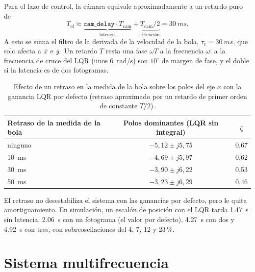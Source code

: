Para el lazo de control, la cámara equivale aproximadamente a un retardo puro de
\begin{equation}
  T_{\text{ef}} \approx \underbrace{\texttt{cam\_delay}\cdot T_{\text{cam}}}_{\text{latencia}} + \underbrace{T_{\text{cam}}/2}_{\text{retención}} = \SI{30}{ms}.
\end{equation}
A esto se suma el filtro de la derivada de la velocidad de la bola, $\tau_c=\SI{30}{ms}$, que solo afecta a $\dot{x}$ e $\dot{y}$. Un retardo $T$ resta una fase $\omega T$ a la frecuencia $\omega$: a la frecuencia de cruce del LQR (unos \SI{6}{rad/s}) son $10^\circ$ de margen de fase, y el doble si la latencia es de dos fotogramas.

\begin{table}[H]
\centering\small
\begin{tabular}{@{}lcc@{}}
\toprule
Retraso de la medida de la bola & Polos dominantes (LQR sin integral) & $\zeta$\\
\midrule
ninguno & $-5{,}12\pm j5{,}75$ & 0,67\\
\SI{10}{ms} & $-4{,}69\pm j5{,}97$ & 0,62\\
\SI{30}{ms} & $-3{,}90\pm j6{,}22$ & 0,53\\
\SI{50}{ms} & $-3{,}23\pm j6{,}29$ & 0,46\\
\bottomrule
\end{tabular}
\caption{Efecto de un retraso en la medida de la bola sobre los polos del eje $x$ con la ganancia LQR por defecto (retraso aproximado por un retardo de primer orden de constante $T/2$).}
\label{tab:retraso}
\end{table}

El retraso no desestabiliza el sistema con las ganancias por defecto, pero le quita amortiguamiento. En simulación, un escalón de posición con el LQR tarda \SI{1.47}{s} sin latencia, \SI{2.06}{s} con un fotograma (el valor por defecto), \SI{4.27}{s} con dos y \SI{4.92}{s} con tres, con sobreoscilaciones del 4, 7, 12 y 23\,\%.

\section{Sistema multifrecuencia}

